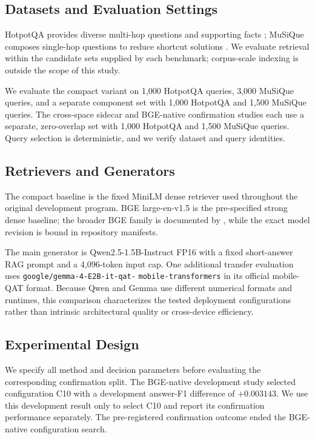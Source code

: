 \documentclass[11pt]{article}
\begin{document}
\subsection{Datasets and Evaluation Settings}

HotpotQA provides diverse multi-hop questions and supporting facts
\citep{yang2018hotpotqa}; MuSiQue composes single-hop questions to reduce
shortcut solutions \citep{trivedi2022musique}. We evaluate retrieval within the
candidate sets supplied by each benchmark; corpus-scale indexing is outside the
scope of this study.

We evaluate the compact variant on 1,000 HotpotQA queries, 3,000 MuSiQue
queries, and a separate component set with 1,000 HotpotQA and 1,500 MuSiQue
queries. The cross-space sidecar and BGE-native confirmation studies each use a
separate, zero-overlap set with 1,000 HotpotQA and 1,500 MuSiQue queries. Query
selection is deterministic, and we verify dataset and query identities.

\subsection{Retrievers and Generators}

The compact baseline is the fixed MiniLM dense retriever used throughout the
original development program. BGE
large-en-v1.5 is the pre-specified strong dense baseline; the broader BGE
family is documented by \citet{xiao2023bge}, while the exact model revision is
bound in repository manifests.

The main generator is Qwen2.5-1.5B-Instruct FP16 with a fixed short-answer RAG
prompt and a 4,096-token input cap. One additional transfer evaluation uses
\texttt{google/gemma-4-E2B-it-qat-}\allowbreak
\texttt{mobile-transformers} in its official
mobile-QAT format. Because Qwen and Gemma use different numerical formats and
runtimes, this comparison characterizes the tested deployment configurations
rather than intrinsic architectural quality or cross-device efficiency.

\subsection{Experimental Design}

We specify all method and decision parameters before evaluating the
corresponding confirmation split. The BGE-native development study selected
configuration C10 with a development answer-F1 difference of $+0.003143$.
We use this development result only to select C10 and report its confirmation
performance separately. The pre-registered confirmation outcome ended the
BGE-native configuration search.
\end{document}

